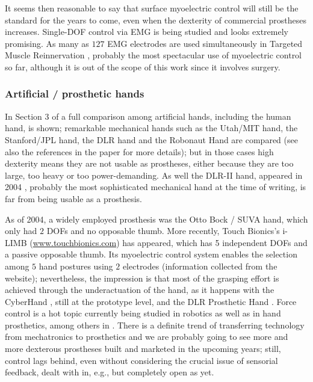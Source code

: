 \documentclass[review,authoryear]{elsarticle}
\renewcommand{\cite}{\citep}
\begin{document}
It seems then reasonable to say that surface myoelectric control will still be the
standard for the years to come, even when the dexterity of commercial prostheses
increases. Single-DOF control via EMG is being studied \cite{englehart08} and looks
extremely promising. As many as $127$ EMG electrodes are used simultaneously in Targeted
Muscle Reinnervation \cite{kuiken06}, probably the most spectacular use of myoelectric control
so far, although it is out of the scope of this work since it involves surgery.

\subsubsection{Artificial / prosthetic hands}

In Section $3$ of \cite{zecca02} a full comparison among artificial hands, including
the human hand, is shown; remarkable mechanical hands such as the Utah/MIT hand, the
Stanford/JPL hand, the DLR hand and the Robonaut Hand are compared (see also the
references in the paper for more details); but in those cases high dexterity means they
are not usable as prostheses, either because they are too large, too heavy or too power-demanding.
As well the DLR-II hand, appeared in 2004 \cite{ButFisGre2004}, probably the most sophisticated
mechanical hand at the time of writing, is far from being usable as a prosthesis.

As of 2004, a widely employed prosthesis was the Otto Bock / SUVA hand, which only had $2$ DOFs and
no opposable thumb. More recently, Touch Bionics's i-LIMB (\url{www.touchbionics.com}) has appeared, which has
5 independent DOFs and a passive opposable thumb. Its myoelectric control system enables
the selection among $5$ hand postures using $2$ electrodes (information collected from the
website); nevertheless, the impression is that most of the grasping effort is achieved through
the underactuation of the hand, as it happens with the CyberHand \cite{cyberhand}, still at
the prototype level, and the DLR Prosthetic Hand \cite{Hua2006}. Force control is a hot topic
currently being studied in robotics \cite{ott,thomas} as well as in hand prosthetics, among others
in \cite{meek1,meek2}. There is a definite trend of transferring technology from
mechatronics to prosthetics and we are probably going to see more and more dexterous
prostheses built and marketed in the upcoming years; still, control
lags behind, even without considering the crucial issue of sensorial feedback,
dealt with in, e.g., \cite{cipriani} but completely open as yet.
\end{document}
